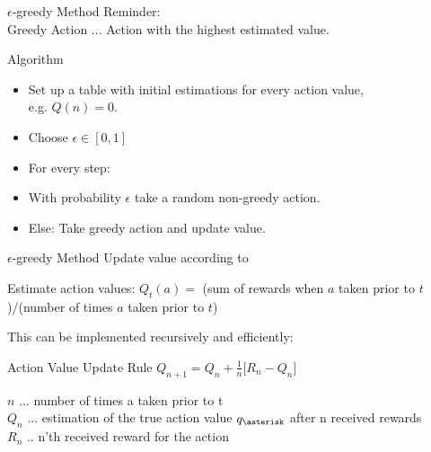 \documentclass{beamer}
\begin{document}
\begin{frame}{$\epsilon$-greedy Method}
	Reminder: \\
	\hspace{0.5cm} Greedy Action ... Action with the highest estimated value.\\
	\vspace{0.5cm}
	\begin{exampleblock}{Algorithm}
	\begin{itemize}
	\item Set up a table with initial estimations for every action value, \\ e.g. $Q(n) = 0$.
	\item Choose $\epsilon \in [0,1]$
	\item For every step:
	\item \hspace{1cm}With probability $\epsilon$ take a random non-greedy action.
	\item \hspace{1cm}Else: Take greedy action and update value.
	\end{itemize}	
	\end{exampleblock}
\end{frame}

\begin{frame}{$\epsilon$-greedy Method}
	Update value according to 
	\begin{block}{Estimate action values:}
		$Q_t(a) = $ (sum of rewards when $a$ taken prior to $t$)/(number of times $a$ taken prior to $t$)
	\end{block}
	
	This can be implemented recursively and efficiently:
	\begin{alertblock}{Action Value Update Rule}
		$ Q_{n+1} = Q_n + \frac{1}{n} \big[ R_n - Q_n \big] $
	\end{alertblock}
	$n$ ... number of times a taken prior to t\\
	 $Q_n$ ... estimation of the true action value $q_{\asterisk}$ after n received rewards\\
	 $R_n$ .. n'th received reward for the action
	
\end{frame}
\end{document}
